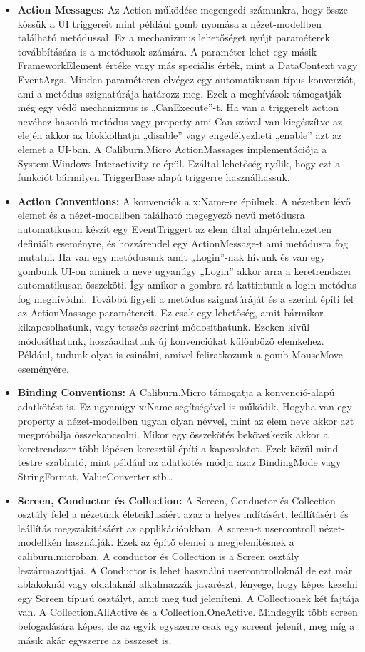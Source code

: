 \documentclass[
]{thesis-ekf}
\theoremstyle{definition}
\theoremstyle{remark}
\begin{document}
\begin{itemize}[leftmargin=*]
\item \textbf{Action Messages: }Az Action működése megengedi számunkra, hogy össze kössük a UI triggereit mint például gomb nyomása a nézet-modellben található metódussal. Ez a mechanizmus lehetőséget nyújt paraméterek továbbítására is a metódusok számára. A paraméter lehet egy másik FrameworkElement értéke vagy más speciális érték, mint a DataContext vagy EventArgs. Minden paraméteren elvégez egy automatikusan típus konverziót, ami a metódus szignatúrája határozz meg. Ezek a meghívások támogatják még egy védő mechanizmus is „CanExecute”-t. Ha van a triggerelt action nevéhez hasonló metódus vagy property ami Can szóval van kiegészítve az elején akkor az blokkolhatja „disable” vagy engedélyezheti „enable” azt az elemet a UI-ban. A Caliburn.Micro ActionMassages implementációja a System.Windows.Interactivity-re épül. Ezáltal lehetőség nyílik, hogy ezt a funkciót bármilyen TriggerBase alapú triggerre használhassuk.\cite{caliburn}	
\item \textbf{Action Conventions: }A konvenciók a x:Name-re épülnek. A nézetben lévő elemet és a nézet-modellben található megegyező nevű metódusra automatikusan készít egy EventTriggert az elem által alapértelmezetten definiált eseményre, és hozzárendel egy ActionMessage-t ami metódusra fog mutatni. Ha van egy metódusunk amit „Login”-nak hívunk és van egy gombunk UI-on aminek a neve ugyanúgy „Login” akkor arra a keretrendszer automatikusan összeköti. Így amikor a gombra rá kattintunk a login metódus fog meghívódni. Továbbá figyeli a metódus szignatúráját és a szerint építi fel az ActionMassage paramétereit. Ez csak egy lehetőség, amit bármikor kikapcsolhatunk, vagy tetszés szerint módosíthatunk. Ezeken kívül módosíthatunk, hozzáadhatunk új konvenciókat különböző elemkehez. Például, tudunk olyat is csinálni, amivel feliratkozunk a gomb MouseMove eseményére.  \cite{caliburn}
\item \textbf{Binding Conventions: }A Caliburn.Micro támogatja a konvenció-alapú adatkötést is. Ez ugyanúgy x:Name segítségével is működik. Hogyha van egy property a nézet-modellben ugyan olyan névvel, mint az elem neve akkor azt megpróbálja összekapcsolni. Mikor egy összekötés bekövetkezik akkor a keretrendszer több lépésen keresztül építi a kapcsolatot. Ezek közül mind testre szabható, mint például az adatkötés módja azaz BindingMode vagy StringFormat, ValueConverter stb\dots 	\cite{caliburn}
\item \textbf{Screen, Conductor és Collection: }A Screen, Conductor és Collection osztály felel a nézetünk életciklusáért azaz a helyes indításért, leállításért és leállítás megszakításáért az applikációnkban. A screen-t usercontroll nézet-modellkén használják. Ezek az építő elemei a megjelenítésnek a caliburn.microban. A conductor és Collection is a Screen osztály leszármazottjai. A Conductor is lehet használni usercontrolloknál de ezt már ablakoknál vagy oldalaknál alkalmazzák javarészt, lényege, hogy képes kezelni egy Screen típusú osztályt, amit meg tud jeleníteni. A Collectionek két fajtája van.  A Collection.AllActive és a Collection.OneActive. Mindegyik több screen befogadására képes, de az egyik egyszerre csak egy screent jelenít, meg míg a másik akár egyszerre az összeset is.

\end{itemize}
\end{document}
